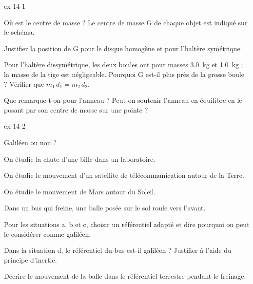 \begin{blocLivre}{ex-14-1}
\begin{exercice}[1]{Où est le centre de masse ?}
Le centre de masse G de chaque objet est indiqué sur le schéma.
\begin{questions}
\item Justifier la position de G pour le disque homogène et pour l'haltère symétrique.
\item Pour l'haltère dissymétrique, les deux boules ont pour masses \qty{3,0}{kg} et \qty{1,0}{kg} ; la masse de la tige
est négligeable. Pourquoi G est-il plus près de la grosse boule ? Vérifier que $m_1\,d_1=m_2\,d_2$.
\item Que remarque-t-on pour l'anneau ? Peut-on soutenir l'anneau en équilibre en le posant par son centre de masse
sur une pointe ?
\end{questions}
\end{exercice}
\end{blocLivre}
\begin{blocLivre}{ex-14-2}
\begin{exercice}[1]{Galiléen ou non ?}
\begin{questions}[label=\otLabel{\alph*.},leftmargin=1.9em,itemsep=0pt,parsep=0.15em]
\item On étudie la chute d'une bille dans un laboratoire.
\item On étudie le mouvement d'un satellite de télécommunication autour de la Terre.
\item On étudie le mouvement de Mars autour du Soleil.
\item Dans un bus qui freine, une balle posée sur le sol roule vers l'avant.
\end{questions}
\begin{questions}
\item Pour les situations a, b et c, choisir un référentiel adapté et dire pourquoi on peut le considérer comme galiléen.
\item Dans la situation d, le référentiel du bus est-il galiléen ? Justifier à l'aide du principe d'inertie.
\item Décrire le mouvement de la balle dans le référentiel terrestre pendant le freinage.
\end{questions}
\end{exercice}
\end{blocLivre}
